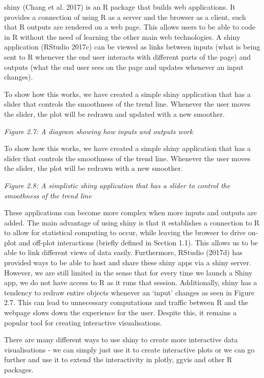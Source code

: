 \documentclass[11pt,]{report}
\begin{document}
\textsf{shiny} (Chang et al. 2017) is an R package that builds web
applications. It provides a connection of using R as a server and the
browser as a client, such that R outputs are rendered on a web page.
This allows users to be able to code in R without the need of learning
the other main web technologies. A \textsf{shiny} application (RStudio
2017c) can be viewed as links between inputs (what is being sent to R
whenever the end user interacts with different parts of the page) and
outputs (what the end user sees on the page and updates whenever an
input changes).

To show how this works, we have created a simple \textsf{shiny}
application that has a slider that controls the smoothness of the trend
line. Whenever the user moves the slider, the plot will be redrawn and
updated with a new smoother.

\emph{Figure 2.7: A diagram showing how inputs and outputs work}

To show how this works, we have created a simple shiny application that
has a slider that controls the smoothness of the trend line. Whenever
the user moves the slider, the plot will be redrawn with a new smoother.

\emph{Figure 2.8: A simplistic shiny application that has a slider to
control the smoothness of the trend line}

These applications can become more complex when more inputs and outputs
are added. The main advantage of using \textsf{shiny} is that it
establishes a connection to R to allow for statistical computing to
occur, while leaving the browser to drive on-plot and off-plot
interactions (briefly defined in Section 1.1). This allows us to be able
to link different views of data easily. Furthermore, RStudio (2017d) has
provided ways to be able to host and share these shiny apps via a shiny
server. However, we are still limited in the sense that for every time
we launch a Shiny app, we do not have access to R as it runs that
session. Additionally, \textsf{shiny} has a tendency to redraw entire
objects whenever an `input' changes as seen in Figure 2.7. This can lead
to unnecessary computations and traffic between R and the webpage slows
down the experience for the user. Despite this, it remains a popular
tool for creating interactive visualisations.

There are many different ways to use shiny to create more interactive
data visualisations - we can simply just use it to create interactive
plots or we can go further and use it to extend the interactivity in
\textsf{plotly}, \textsf{ggvis} and other R packages.
\end{document}
